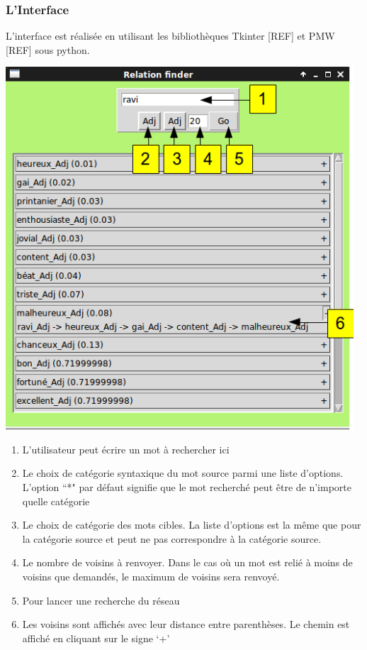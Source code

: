 \subsubsection{L'Interface}

L'interface est réalisée en utilisant les bibliothèques Tkinter [REF] et PMW 
[REF] sous python.

\begin{center}
\includegraphics[width=13cm]{relationfinderinterface.png}
\end{center}

\begin{enumerate}
    \item{L'utilisateur peut écrire un mot à rechercher ici}
    \item{Le choix de catégorie syntaxique du mot source parmi une liste 
    d'options. L'option ``*" par défaut signifie que le mot recherché peut être 
    de n'importe quelle catégorie}
    \item{Le choix de catégorie des mots cibles. La liste d'options est la même 
    que pour la catégorie source et peut ne pas correspondre à la catégorie 
    source.}
    \item{Le nombre de voisins à renvoyer. Dans le cas où un mot est relié à 
    moins de voisins que demandés, le maximum de voisins sera renvoyé.}
    \item{Pour lancer une recherche du réseau}
    \item{Les voisins sont affichés avec leur distance entre parenthèses. Le 
    chemin est affiché en cliquant sur le signe \lq{+}\rq{}}   

\end{enumerate}

